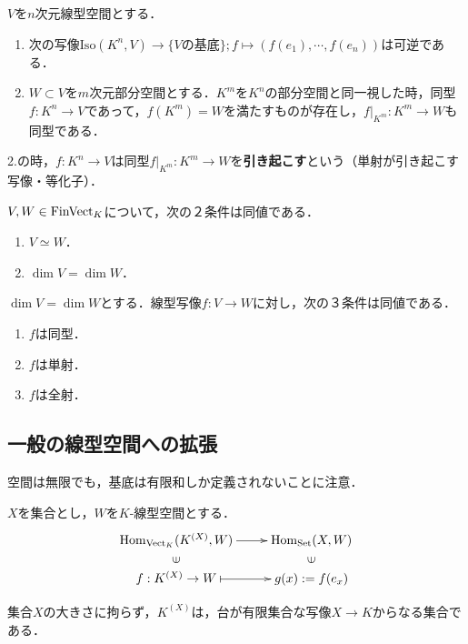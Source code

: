 \documentclass[uplatex, 12pt, dvipdfmx]{jsreport}
\begin{document}
\begin{corollary}
    $V$を$n$次元線型空間とする．
    \begin{enumerate}
        \item 次の写像$\mathrm{Iso}(K^n,V)\to\{Vの基底\}; f\mapsto (f(e_1),\cdots,f(e_n))$は可逆である．
        \item $W\subset V$を$m$次元部分空間とする．$K^m$を$K^n$の部分空間と同一視した時，同型$f:K^n\to V$であって，$f(K^m)=W$を満たすものが存在し，$f|_{K^m}:K^m\to W$も同型である．
    \end{enumerate}
    2.の時，$f:K^n\to V$は同型$f|_{K^m}:K^m\to W$を\textbf{引き起こす}という（単射が引き起こす写像・等化子）．
\end{corollary}

\begin{corollary}
    $V,W\in\mathrm{FinVect}_K$について，次の２条件は同値である．
    \begin{enumerate}
        \item $V\simeq W$．
        \item $\dim V=\dim W$．
    \end{enumerate}
\end{corollary}

\begin{proposition}
    $\dim V=\dim W$とする．線型写像$f:V\to W$に対し，次の３条件は同値である．
    \begin{enumerate}
        \item $f$は同型．
        \item $f$は単射．
        \item $f$は全射．
    \end{enumerate}
\end{proposition}

\subsection{一般の線型空間への拡張}

空間は無限でも，基底は有限和しか定義されないことに注意．

\begin{proposition}\label{prop-categorical-basis-infinity}
    $X$を集合とし，$W$を$K$-線型空間とする．
    \[\xymatrix@R-2pc{
        {\Hom_{\Vect_K}(K^{(X)},W)}\ar[r]&{\Hom_{\Set}(X,W)}\\
        \rotatebox[origin=c]{90}{$\in$}&\rotatebox[origin=c]{90}{$\in$}\\
        f:K^{(X)}\to W\ar@{|->}[r]&g(x):=f(e_x)
    }\]
\end{proposition}
\begin{remark}
    集合$X$の大きさに拘らず，$K^{(X)}$は，台が有限集合な写像$X\to K$からなる集合である．
\end{remark}
\end{document}
